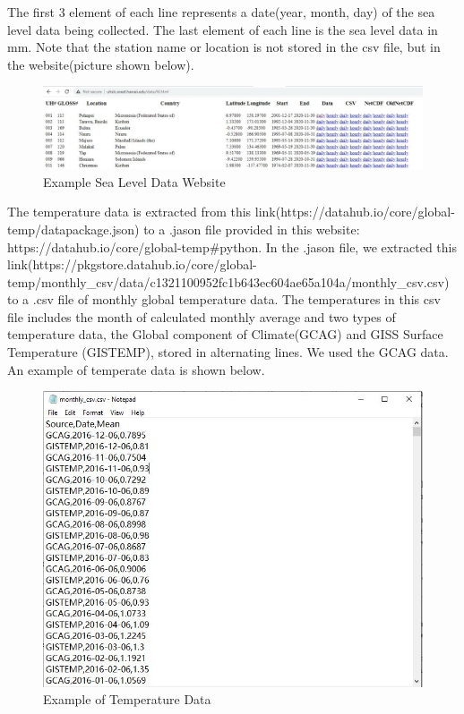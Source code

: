 \documentclass[fontsize=11pt]{article}
\begin{document}
    The first 3 element of each line represents a date(year, month, day) of the sea level data being collected. The last element of each line is the sea level data in mm. Note that the station name or location is not stored in the csv file, but in the website(picture shown below).
     \begin{figure}[h!]
    \centering
    \includegraphics[scale=0.5]{sea_level_website.JPG}
    \caption{Example Sea Level Data Website}
    \label{fig:sea_level_website.JPG}
    \end{figure}
    
    The temperature data is extracted from this link(https://datahub.io/core/global-temp/datapackage.json) to a .jason file provided in this website: https://datahub.io/core/global-temp#python. In the .jason file, we extracted this link(https://pkgstore.datahub.io/core/global-temp/monthly\_csv/data/c1321100952fc1b643ec604ae65a104a/monthly\_csv.csv) to a .csv file of monthly global temperature data. The temperatures in this csv file includes the month of calculated monthly average and two types of temperature data, the Global component of Climate(GCAG) and GISS Surface Temperature (GISTEMP), stored in alternating lines. We used the GCAG data. An example of temperate data is shown below. 
    
    \begin{figure}[h!]
    \centering
    \includegraphics[scale=0.5]{sample_temperature_data.JPG}
    \caption{Example of Temperature Data}
    \label{fig:sample_temperature_data.JPG}
    \end{figure}
    
\end{document}
